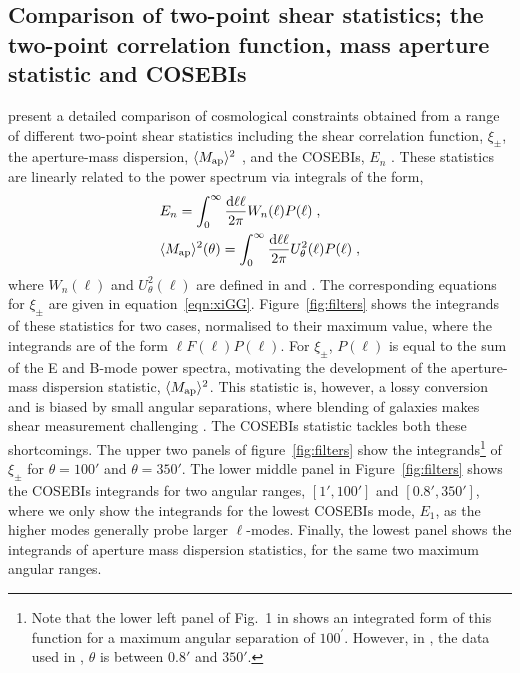 \subsection{Comparison of two-point shear statistics; the two-point correlation function, mass aperture statistic and COSEBIs}


\citet{CFHTLenS-2pt-notomo} present a detailed comparison of cosmological
constraints obtained from a range of different two-point shear statistics
including the shear correlation function, $\xi_\pm$, the aperture-mass
dispersion, $\langle M_ {\rm ap} \rangle ^2$ \citep{1998MNRAS.296..873S}, and
the COSEBIs, $E_n$ \citep{COSEBIs}.  These statistics are linearly related to
the power spectrum via integrals of the form,
%
\begin{align}
& E_n =\int_0^{\infty}\frac{{\rm d} \ell \ell}{2\pi} W_n(\ell) P(\ell)\;,\\ \nonumber
& \langle M_ {\rm ap} \rangle ^2(\theta)=\int_0^{\infty}\frac{{\rm d} \ell \ell}{2\pi} U^2_\theta(\ell) P(\ell)\;,
\end{align}
%
where $W_n(\ell)$ and $U^2_\theta(\ell)$ are defined in \cite{COSEBIs} and
\cite{1998MNRAS.296..873S}. The corresponding equations for $\xi_\pm$ are given
in equation~\ref{eqn:xiGG}. Figure~\ref{fig:filters} shows the integrands of
these statistics for two cases, normalised to their maximum value, where the
integrands are of the form $\ell F(\ell) P(\ell)$. For $\xi_\pm$, $P(\ell)$ is
equal to the sum of the E and B-mode power spectra, motivating the development
of the aperture-mass dispersion statistic, $\langle M_ {\rm ap} \rangle ^2$.
This statistic is, however, a lossy conversion and is biased by small angular
separations, where blending of galaxies makes shear measurement challenging
\citep{KSE06}.  The COSEBIs statistic tackles both these
shortcomings.  The upper two panels of figure~\ref{fig:filters} show the
integrands\footnote{Note that the lower left panel of Fig.~1 in
\citet{2016arXiv161104954K} shows an integrated form of this function for a
maximum angular separation of $100^\prime$. However, in \citet{CFHTLenS-2pt-notomo},
the data used in \citet{2016arXiv161104954K}, $\theta$ is between $0.8'$ and
$350'$.} of $\xi_\pm$ for $\theta=100'$ and $\theta=350'$. The lower middle
panel in Figure~\ref{fig:filters} shows the COSEBIs integrands for two angular
ranges, $[1',100']$ and $[0.8',350']$, where we only show the integrands for
the lowest COSEBIs mode, $E_1$, as the higher modes generally probe larger
$\ell$-modes.  Finally, the lowest panel shows the integrands of aperture mass
dispersion statistics, for the same two maximum angular ranges. 

